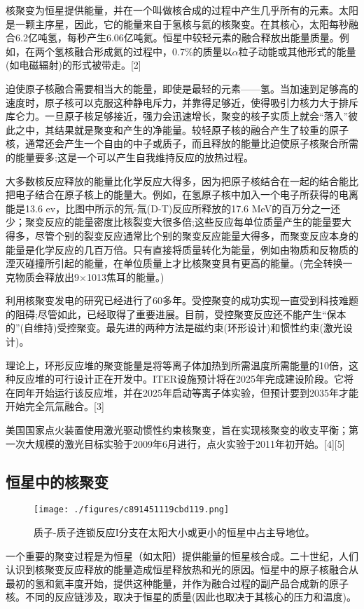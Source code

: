 核聚变为恒星提供能量，并在一个叫做核合成的过程中产生几乎所有的元素。太阳是一颗主序星，因此，它的能量来自于氢核与氦的核聚变。在其核心，太阳每秒融合6.2亿吨氢，每秒产生6.06亿吨氦。恒星中较轻元素的融合释放出能量质量。例如，在两个氢核融合形成氦的过程中，0.7\%的质量以$\alpha$粒子动能或其他形式的能量(如电磁辐射)的形式被带走。[2]

迫使原子核融合需要相当大的能量，即使是最轻的元素——氢。当加速到足够高的速度时，原子核可以克服这种静电斥力，并靠得足够近，使得吸引力核力大于排斥库仑力。一旦原子核足够接近，强力会迅速增长，聚变的核子实质上就会“落入”彼此之中，其结果就是聚变和产生的净能量。较轻原子核的融合产生了较重的原子核，通常还会产生一个自由的中子或质子，而且释放的能量比迫使原子核聚合所需的能量要多;这是一个可以产生自我维持反应的放热过程。

大多数核反应释放的能量比化学反应大得多，因为把原子核结合在一起的结合能比把电子结合在原子核上的能量大。例如，在氢原子核中加入一个电子所获得的电离能是13.6 ev，比图中所示的氘-氚(D-T)反应所释放的17.6 MeV的百万分之一还少；聚变反应的能量密度比核裂变大很多倍;这些反应每单位质量产生的能量要大得多，尽管个别的裂变反应通常比个别的聚变反应能量大得多，而聚变反应本身的能量是化学反应的几百万倍。只有直接将质量转化为能量，例如由物质和反物质的湮灭碰撞所引起的能量，在单位质量上才比核聚变具有更高的能量。(完全转换一克物质会释放出9×1013焦耳的能量。)

利用核聚变发电的研究已经进行了60多年。受控聚变的成功实现一直受到科技难题的阻碍;尽管如此，已经取得了重要进展。目前，受控聚变反应还不能产生“保本的”(自维持)受控聚变。最先进的两种方法是磁约束(环形设计)和惯性约束(激光设计)。

理论上，环形反应堆的聚变能量是将等离子体加热到所需温度所需能量的10倍，这种反应堆的可行设计正在开发中。ITER设施预计将在2025年完成建设阶段。它将在同年开始运行该反应堆，并在2025年启动等离子体实验，但预计要到2035年才能开始完全氘氚融合。[3]

美国国家点火装置使用激光驱动惯性约束核聚变，旨在实现核聚变的收支平衡；第一次大规模的激光目标实验于2009年6月进行，点火实验于2011年初开始。[4][5]

\subsection{恒星中的核聚变}
\begin{figure}[ht]
\centering
\texttt{[image: ./figures/c891451119cbd119.png]}
\caption{质子-质子连锁反应I分支在太阳大小或更小的恒星中占主导地位。} \label{fig_HJB_2}
\end{figure}
一个重要的聚变过程是为恒星（如太阳）提供能量的恒星核合成。二十世纪，人们认识到核聚变反应释放的能量造成恒星释放热和光的原因。恒星中的原子核融合从最初的氢和氦丰度开始，提供这种能量，并作为融合过程的副产品合成新的原子核。不同的反应链涉及，取决于恒星的质量(因此也取决于其核心的压力和温度)。

